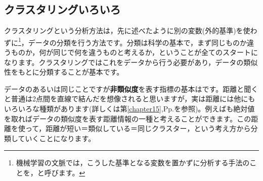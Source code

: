 \documentclass{ltjsbook}
\begin{document}
\subsection{クラスタリングいろいろ}
クラスタリングという分析方法は，先に述べたように別の変数(外的基準)を使わずに\footnote{機械学習の文脈では，こうした基準となる変数を置かずに分析する手法のことを，と呼びます。}，データの分類を行う方法です。分類は科学の基本で，まず同じものか違うものか，何が同じで何を違うものと考えるか，ということが全てのスタートになります。クラスタリングではこれをデータから行う必要があり，データの類似性をもとに分類することが基本です。

データのあるいは同じことですが\textbf{非類似度}を表す指標の基本はです。距離と聞くと普通は2点間を直線で結んだを想像されると思いますが，実は距離には他にもいろいろな種類があります(詳しくは第\ref{chapter15},Pp.\pageref{distance}を参照)。例えばも絶対値を取ればデータの類似度を表す距離情報の一種と考えることができます。この距離を使って，距離が短い＝類似している＝同じクラスター，という考え方から分類していくことになります。
\end{document}

